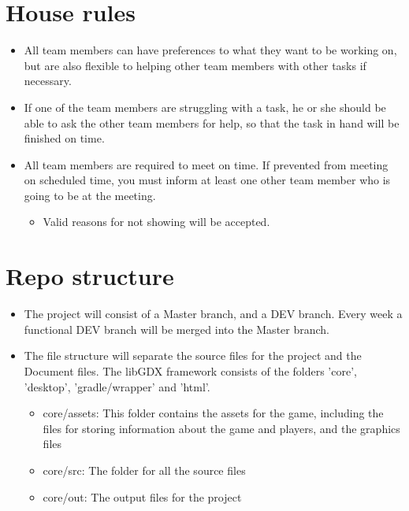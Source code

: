 \documentclass{article}
\begin{document}
\newpage
\section*{House rules}
\begin{itemize}
\item All team members can have preferences to what they want to be working on, but are also flexible to helping other team members with other tasks if necessary.
\item If one of the team members are struggling with a task, he or she should be able to ask the other team members for help, so that the task in hand will be finished on time.
\item All team members are required to meet on time. If prevented from meeting on scheduled time, you must inform at least one other team member who is going to be at the meeting.
	\begin{itemize}
	\item Valid reasons for not showing will be accepted.
	\end{itemize}
\end{itemize}
\section*{Repo structure}
\begin{itemize}
\item The project will consist of a Master branch, and a DEV branch. Every week a functional DEV branch will be merged into the Master branch.
\item The file structure will separate the source files for the project and the Document files. The libGDX framework consists of the folders 'core', 'desktop', 'gradle/wrapper' and 'html'.
    \begin{itemize}
        \item core/assets: This folder contains the assets for the game, including the files for storing information about the game and players, and the graphics files
        \item core/src: The folder for all the source files
        \item core/out: The output files for the project
        \end{itemize}
\end{itemize}
\end{document}

